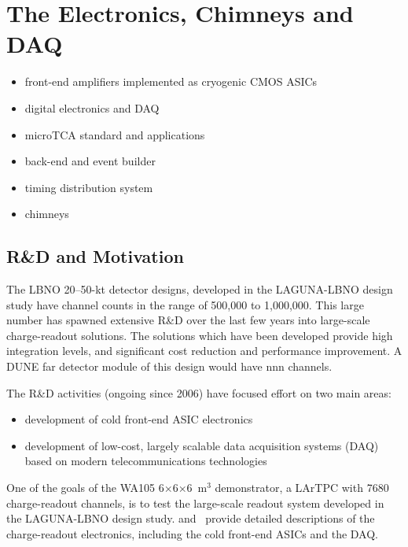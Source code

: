 \section{The Electronics, Chimneys and DAQ}
\label{sec:detectors-fd-alt-elec}


\begin {itemize} 
\item front-end amplifiers implemented as cryogenic CMOS ASICs
\item digital electronics and DAQ
\item microTCA standard and applications
\item back-end and event builder
\item timing distribution system
\item chimneys
\end{itemize}

\subsection{R\&D and Motivation}

The LBNO 20--50-kt detector designs, developed in the LAGUNA-LBNO
design study have channel counts in the range of 500,000 to 1,000,000.
This large number has spawned extensive R\&D over the last few years
into large-scale charge-readout solutions.  The solutions which have
been developed provide high integration levels, and significant cost
reduction and performance improvement.  A DUNE far detector module of this design would have nnn channels.

The R\&D activities (ongoing since 2006) have focused effort on two
main areas:
\begin {itemize} 
\item{development of cold front-end ASIC electronics}
\item{development of low-cost, largely scalable data 
acquisition systems (DAQ) based on modern telecommunications technologies}
\end{itemize}

One of the goals of the WA105 6$\times$6$\times$6~m$^3$ demonstrator,
a LArTPC with \num{7680} charge-readout channels, is to test the
large-scale readout system developed in the LAGUNA-LBNO design
study. \anxdualtdr and~\cite{WA105_SREP} provide detailed descriptions
of the charge-readout electronics, including the cold front-end ASICs
and the DAQ.

